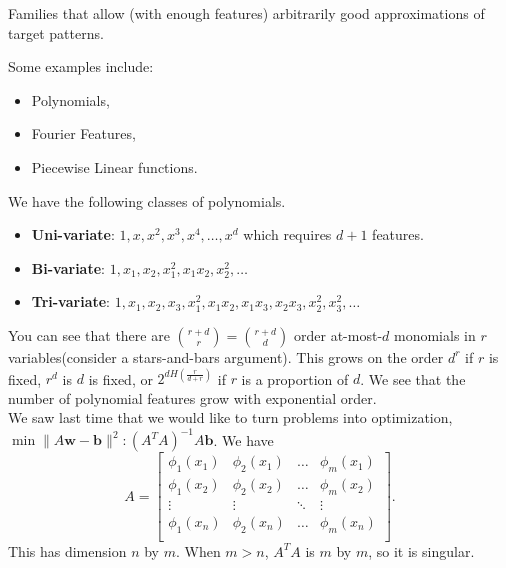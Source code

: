 \documentclass[11pt]{article}
\newcommand{\Vw}{\mathbf{w}}
\newcommand{\Vb}{\mathbf{b}}
\begin{document}
\begin{definition} Families that allow (with enough features) arbitrarily good approximations of target patterns.
\end{definition}
Some examples include:
\begin{itemize}
\item Polynomials,
\item Fourier Features,
\item Piecewise Linear functions.
\end{itemize}
\begin{example}  We have the following classes of polynomials.

\begin{itemize}
\item \textbf{Uni-variate}: $1, x, x^2, x^3, x^4, \dots, x^d$ which requires $d+1$ features.
\item \textbf{Bi-variate}: $1, x_1, x_2, x_1^2, x_1x_2, x_2^2, \dots$
\item \textbf{Tri-variate}: $1, x_1, x_2, x_3, x_1^2, x_1x_2, x_1x_3, x_2x_3, x_2^2, x_3^2, \dots$
\end{itemize}
You can see that there are $\binom{r+d}{r} =\binom{r+d}{d}$ order at-most-$d$ monomials in $r$ variables(consider a stars-and-bars argument).  This grows on the order $d^r$ if $r$ is fixed, $r^d$ is $d$ is fixed, or $2^{dH(\frac{r}{d+r})}$ if $r$ is a proportion of $d$.  We see that the number of polynomial features grow with exponential order.\\
We saw last time that we would like to turn problems into optimization, $\min \| A\Vw - \Vb\|^2 : (A^TA)^{-1}A\Vb$. We have 
$$A = \begin{bmatrix}
\phi_1(x_1) & \phi_2(x_1) & \dots & \phi_m(x_1) \\
\phi_1(x_2) & \phi_2(x_2) & \dots & \phi_m(x_2) \\
\vdots & \vdots & \ddots & \vdots \\
\phi_1(x_n) & \phi_2(x_n) & \dots & \phi_m(x_n) \\
\end{bmatrix}.$$
This has dimension $n$ by $m$.  When $m > n$, $A^TA$ is $m$ by $m$, so it is singular.
\end{example}
\end{document}
